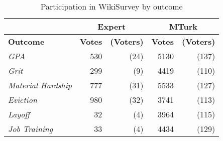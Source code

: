 
\begin{table}[ht]
\centering
\caption{Participation in WikiSurvey by outcome}
\label{tab:wikisurvey}
\begin{tabular}{lrr|rr}
\toprule
           & \multicolumn{2}{c}{\textbf{Expert}}  & \multicolumn{2}{c}{\textbf{MTurk}} \\\hline
\textbf{Outcome}           & \textbf{Votes} & \textbf{(Voters)} & \textbf{Votes} & \textbf{(Voters)} \\
\textit{GPA}               & 530                   & (24)              & 5130                 & (137)             \\
\textit{Grit}              & 299                   &  (9)              & 4419                 & (110)             \\
\textit{Material Hardship} & 777                   & (31)              & 5533                 & (127)             \\
\textit{Eviction}          & 980                   & (32)              & 3741                 & (113)             \\
\textit{Layoff}            & 32                    &  (4)              & 3964                 & (115)             \\
\textit{Job Training}      & 33                    &  (4)              & 4434                 & (129)             \\
\bottomrule
\end{tabular}
\end{table}
